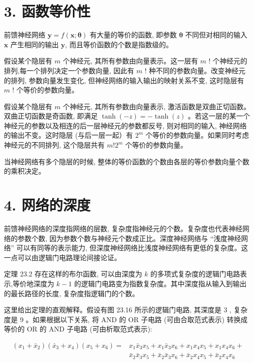 \documentclass[10pt]{article}
\begin{document}
\begin{CJK*}{UTF8}{bsmi}
\section*{3. 函数等价性}
前馈神经网络 $\boldsymbol{y}=f(\boldsymbol{x} ; \boldsymbol{\theta})$ 有大量的等价的函数, 即参数 $\boldsymbol{\theta}$ 不同但对相同的输入 $\boldsymbol{x}$ 产生相同的输出 $\boldsymbol{y}$, 而且等价函数的个数是指数级的。

假设某个隐层有 $m$ 个神经元, 其所有参数由向量表示。这一层有 $m$ ! 个神经元的排列,每一个排列决定一个参数向量, 因此有 $m$ ! 种不同的参数向量。改变神经元的排列, 参数向量发生变化, 但神经网络的输入输出的映射关系不变, 这时隐层有 $m$ ! 个等价的参数向量。

假设某个隐层有 $m$ 个神经元, 其所有参数由向量表示, 激活函数是双曲正切函数。双曲正切函数是奇函数, 即满足 $\tanh (-z)=-\tanh (z)$ 。若这一层的某一个神经元的参数以及相连的后一层神经元的参数都反号, 则对相同的输入, 神经网络的输出不变。这时隐层 (与后一层一起）有 $2^{m}$ 个等价的参数向量。如果同时考虑神经元的不同排列, 这个隐层共有 $m ! 2^{m}$ 个等价的参数向量。

当神经网络有多个隐层的时候, 整体的等价函数的个数由各层的等价参数向量个数的乘积决定。

\section*{4. 网络的深度}
前馈神经网络的深度指网络的层数, 复杂度指神经元的个数。复杂度也代表神经网络的参数个数, 因为参数个数与神经元个数成正比。深度神经网络与 “浅度神经网络” 可以有同等的表示能力, 但深度神经网络比浅度神经网络有更低的复杂度。这一点可以由逻辑门电路理论间接论证。

定理 23.2 存在这样的布尔函数, 可以由深度为 $k$ 的多项式复杂度的逻辑门电路表示,等价地深度为 $k-1$ 的逻辑门电路变为指数复杂度。其中深度指从输入到输出的最长路径的长度, 复杂度指逻辑门的个数。

这里给出定理的直观解释。假设有图 23.16 所示的逻辑门电路, 其深度是 3 , 复杂度是 9 。如果根据以下关系, 将 AND 的 OR 子电路 (可由合取范式表示) 转换成等价的 OR 的 AND 子电路 (可由析取范式表示):

$$
\begin{aligned}
\left(x_{1}+\bar{x}_{2}\right)\left(\bar{x}_{3}+x_{4}\right)\left(x_{5}+x_{6}\right)= & x_{1} \bar{x}_{3} x_{5}+x_{1} \bar{x}_{3} x_{6}+x_{1} x_{4} x_{5}+x_{1} x_{4} x_{6}+ \\
& \bar{x}_{2} \bar{x}_{3} x_{5}+\bar{x}_{2} \bar{x}_{3} x_{6}+\bar{x}_{2} x_{4} x_{5}+\bar{x}_{2} x_{4} x_{6}
\end{aligned}
$$


\end{CJK*}
\end{document}
